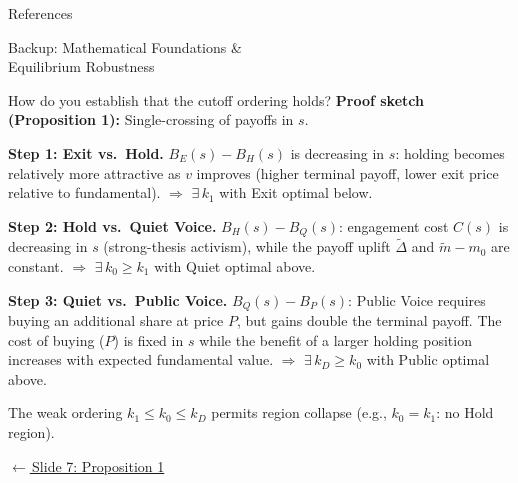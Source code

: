 \documentclass[aspectratio=169,10pt]{beamer}
\newcommand{\1}{\mathbf{1}}
\newcommand{\returnlink}[2]{%
  \par\vspace{0.2em}\hfill{\scriptsize\hyperlink{#1}{\textcolor{brightblue}{$\leftarrow$\,#2}}}%
}
\begin{document}
\begin{frame}[allowframebreaks]{References}
\small
\printbibliography
\end{frame}


\appendix

\begin{frame}[standout]
Backup: Mathematical Foundations \&\\ Equilibrium Robustness
\end{frame}

\begin{frame}{How do you establish that the cutoff ordering holds?}
\hypertarget{backup:proof_prop1}{}
\small
\textbf{Proof sketch (Proposition 1):} Single-crossing of payoffs in $s$.

\vspace{0.3em}

\textbf{Step 1: Exit vs.\ Hold.} $B_E(s) - B_H(s)$ is decreasing in $s$: holding becomes relatively more attractive as $v$ improves (higher terminal payoff, lower exit price relative to fundamental). $\Rightarrow$ $\exists\, k_1$ with Exit optimal below.

\vspace{0.3em}

\textbf{Step 2: Hold vs.\ Quiet Voice.} $B_H(s) - B_Q(s)$: engagement cost $C(s)$ is decreasing in $s$ (strong-thesis activism), while the payoff uplift $\tilde{\Delta}$ and $\tilde{m} - m_0$ are constant. $\Rightarrow$ $\exists\, k_0 \ge k_1$ with Quiet optimal above.

\vspace{0.3em}

\textbf{Step 3: Quiet vs.\ Public Voice.} $B_Q(s) - B_P(s)$: Public Voice requires buying an additional share at price $P$, but gains double the terminal payoff. The cost of buying ($P$) is fixed in $s$ while the benefit of a larger holding position increases with expected fundamental value. $\Rightarrow$ $\exists\, k_D \ge k_0$ with Public optimal above.

\vspace{0.3em}

The weak ordering $k_1 \le k_0 \le k_D$ permits region collapse (e.g., $k_0 = k_1$: no Hold region).

\returnlink{main:prop1}{Slide 7: Proposition 1}
\end{frame}
\end{document}
